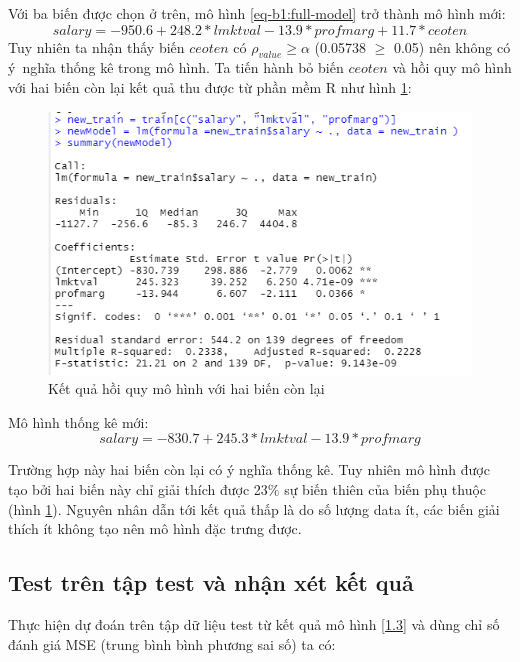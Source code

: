 Với ba biến được chọn ở trên, mô hình \ref{eq-b1:full-model} trở thành mô hình mới:
\begin{equation}\label{1.2}
\textit{salary} = -950.6 + 248.2 * \textit{lmktval} - 13.9 *\textit{profmarg} + 11.7  *\textit{ceoten}
\end{equation}
Tuy nhiên ta nhận thấy biến $\textit{ceoten}$ có $\rho_{value} \ge \alpha$ (0.05738 $\ge$ 0.05) nên không có ý~nghĩa thống kê trong mô hình. Ta tiến hành bỏ biến $\textit{ceoten}$ và hồi quy mô hình với hai biến còn lại kết quả thu được từ phần mềm R như hình \ref{fig-b1:new-summary}:

\begin{figure}[h!]
	\centering
	\includegraphics[width=.7\linewidth]{../Photo Of Result/B1_newsummary.PNG}  
	\caption{Kết quả hồi quy mô hình với hai biến còn lại}
	\label{fig-b1:new-summary}
\end{figure}

Mô hình thống kê mới:
\begin{equation}\label{1.3}
\textit{salary} = -830.7 + 245.3 *\textit{lmktval} -13.9 *\textit{profmarg}
\end{equation}

Trường hợp này hai biến còn lại có ý nghĩa thống kê. Tuy nhiên mô hình được tạo bởi hai biến này chỉ giải thích được 23$\%$ sự biến thiên của biến phụ thuộc (hình \ref{fig-b1:new-summary}). Nguyên nhân dẫn tới kết quả thấp là do số lượng data ít, các biến giải thích ít không tạo nên mô hình đặc trưng được.

\subsection*{Test trên tập test và nhận xét kết quả}

Thực hiện dự đoán trên tập dữ liệu test từ kết quả mô hình \ref{1.3} và dùng chỉ số đánh giá MSE (trung bình bình phương sai số) ta có:


